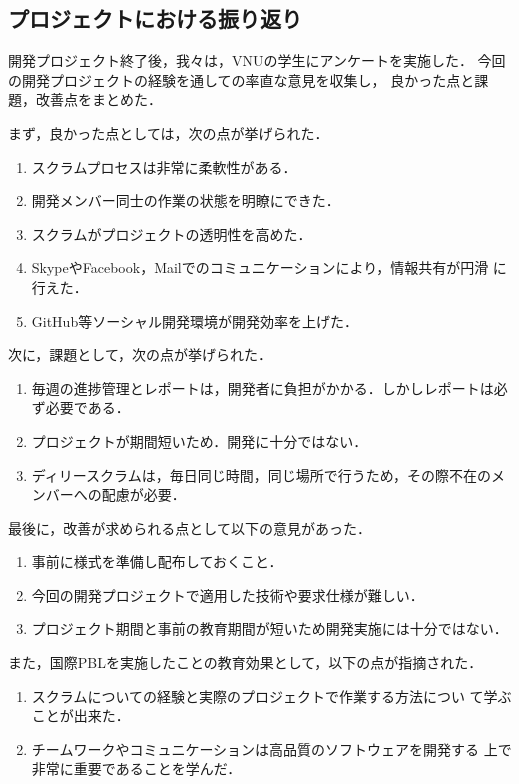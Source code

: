 \documentclass[a4j, 12Q, twocolumn, twoside]{jsarticle}
\begin{document}
\subsection{プロジェクトにおける振り返り}
開発プロジェクト終了後，我々は，VNUの学生にアンケートを実施した．
今回の開発プロジェクトの経験を通しての率直な意見を収集し，
良かった点と課題，改善点をまとめた．

まず，良かった点としては，次の点が挙げられた．

\begin{enumerate}
 \item スクラムプロセスは非常に柔軟性がある．
 \item 開発メンバー同士の作業の状態を明瞭にできた．
 \item スクラムがプロジェクトの透明性を高めた．
 \item SkypeやFacebook，Mailでのコミュニケーションにより，情報共有が円滑
       に行えた．
 \item GitHub等ソーシャル開発環境が開発効率を上げた．
\end{enumerate}

次に，課題として，次の点が挙げられた．

\begin{enumerate}
 \item 毎週の進捗管理とレポートは，開発者に負担がかかる．しかしレポートは必ず必要である．
 \item プロジェクトが期間短いため．開発に十分ではない．
 \item ディリースクラムは，毎日同じ時間，同じ場所で行うため，その際不在のメンバーへの配慮が必要．
\end{enumerate}

最後に，改善が求められる点として以下の意見があった．

\begin{enumerate}
 \item 事前に様式を準備し配布しておくこと．
 \item 今回の開発プロジェクトで適用した技術や要求仕様が難しい．
 \item プロジェクト期間と事前の教育期間が短いため開発実施には十分ではない．
\end{enumerate}

また，国際PBLを実施したことの教育効果として，以下の点が指摘された．

\begin{enumerate}
 \item スクラムについての経験と実際のプロジェクトで作業する方法につい
       て学ぶことが出来た．
 \item チームワークやコミュニケーションは高品質のソフトウェアを開発する
       上で非常に重要であることを学んだ．
\end{enumerate}
\end{document}
